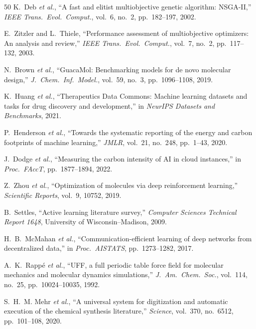 \documentclass[twocolumn,10pt]{article}
\begin{document}
\begin{thebibliography}{50}
K.~Deb \textit{et al.}, ``A fast and elitist multiobjective genetic algorithm: NSGA-II,'' \textit{IEEE Trans.\ Evol.\ Comput.}, vol.~6, no.~2, pp.~182--197, 2002.

E.~Zitzler and L.~Thiele, ``Performance assessment of multiobjective optimizers: An analysis and review,'' \textit{IEEE Trans.\ Evol.\ Comput.}, vol.~7, no.~2, pp.~117--132, 2003.

N.~Brown \textit{et al.}, ``GuacaMol: Benchmarking models for de novo molecular design,'' \textit{J.\ Chem.\ Inf.\ Model.}, vol.~59, no.~3, pp.~1096--1108, 2019.

K.~Huang \textit{et al.}, ``Therapeutics Data Commons: Machine learning datasets and tasks for drug discovery and development,'' in \textit{NeurIPS Datasets and Benchmarks}, 2021.

P.~Henderson \textit{et al.}, ``Towards the systematic reporting of the energy and carbon footprints of machine learning,'' \textit{JMLR}, vol.~21, no.~248, pp.~1--43, 2020.

J.~Dodge \textit{et al.}, ``Measuring the carbon intensity of AI in cloud instances,'' in \textit{Proc.\ FAccT}, pp.~1877--1894, 2022.

Z.~Zhou \textit{et al.}, ``Optimization of molecules via deep reinforcement learning,'' \textit{Scientific Reports}, vol.~9, 10752, 2019.

B.~Settles, ``Active learning literature survey,'' \textit{Computer Sciences Technical Report 1648}, University of Wisconsin--Madison, 2009.

H.~B.~McMahan \textit{et al.}, ``Communication-efficient learning of deep networks from decentralized data,'' in \textit{Proc.\ AISTATS}, pp.~1273--1282, 2017.

A.~K.~Rapp\'{e} \textit{et al.}, ``UFF, a full periodic table force field for molecular mechanics and molecular dynamics simulations,'' \textit{J.\ Am.\ Chem.\ Soc.}, vol.~114, no.~25, pp.~10024--10035, 1992.

S.~H.~M. Mehr \textit{et al.}, ``A universal system for digitization and automatic execution of the chemical synthesis literature,'' \textit{Science}, vol.~370, no.~6512, pp.~101--108, 2020.


\end{thebibliography}
\end{document}
